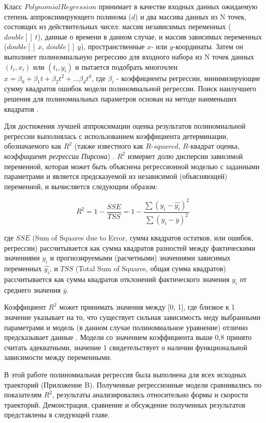Класс $PolynomialRegression$ принимает в качестве входных данных ожидаемую степень аппроксимирующего полинома ($d$) и два массива данных из N точек, состоящих из действительных чисел: массив независимых переменных ($double[]\ t$), данные о времени в данном случае, и массив зависимых переменных ($double[]\ x$, $double[]\ y$), пространственные $x$- или $y$-координаты. Затем он выполняет полиномиальную регрессию для входного набора из N точек данных $(t_i, x_i)$ или $(t_i, y_i)$ и пытается подобрать многочлен $x = \beta_0 + \beta_1 t + \beta_2 t^2 + \ldots \beta_d t^d$, где $\beta_i$ - коэффициенты регрессии, минимизирующие сумму квадратов ошибок модели полиномиальной регрессии. Поиск наилучшего решения для полиномиальных параметров основан на методе наименьших квадратов \cite{article:behav_form_extr}.

Для достижения лучшей аппроксимации оценка результатов полиномиальной регрессии выполнялась с использованием коэффициента детерминации, обозначаемого как $R^2$ (также известного как $R$-$squared$, $R$-$квадрат$ оценка, \textit{коэффициент регрессии Пирсона}) \cite{inbook:stats}. $R^2$ измеряет долю дисперсии зависимой переменной, которая может быть объяснена регрессионной моделью с заданными параметрами и является предсказуемой из независимой (объясняющей) переменной, и вычисляется следующим образом:

\begin{equation}\label{eq:r_sq}
	R^2 = 1 - \frac{SSE}{TSS} = 1 - \frac{\sum{(y_i - \hat{y_i})^2}}{\sum{(y_i - \overline{y})^2}}
\end{equation}

где $SSE$ (Sum of Squares due to Error, сумма квадратов остатков, или ошибок, регрессии) рассчитывается как сумма квадратов разностей между фактическими значениями $y_i$ и прогнозируемыми (расчетными) значениями зависимых переменных $\hat{y_i}$, и $TSS$ (Total Sum of Squares, общая сумма квадратов) рассчитывается как сумма квадратов отклонений фактического значения $y_i$ от среднего значения $\overline{y}$.

Коэффициент $R^2$ может принимать значения между [0, 1], где близкое к 1 значение указывает на то, что существует сильная зависимость меду выбранными параметрами и модель (в данном случае полиномиальное уравнение) отлично предсказывает данные \cite{online:reg_r_interpr}. Модели со значением коэффициента выше 0,8 принято считать адекватными, значение 1 свидетельствует о наличии функциональной зависимости между переменными.

В этой работе полиномиальная регрессия была выполнена для всех исходных траекторий (Приложение B). Полученные регрессионные модели сравнивались по показателям $R^2$, результаты анализировались относительно формы и скорости траекторий. Демонстрация, сравнение и обсуждение полученных результатов представлены в следующей главе.

